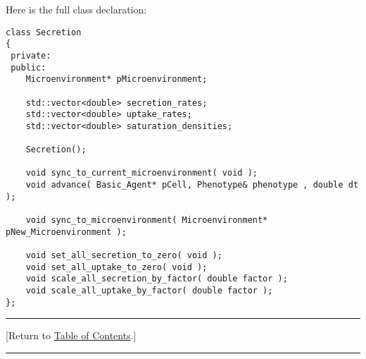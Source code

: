 \documentclass[12pt]{article}
\newcommand{\TOClink}{\begin{center}\hrule\vskip-10pt\phantom{.}\hfill[Return to \hyperlink{TOC}{Table of Contents}.]\hfill\phantom{.}\vskip3pt\hrule\end{center}}
\begin{document}
Here is the full class declaration:
\begin{verbatim}
class Secretion
{
 private:
 public:
    Microenvironment* pMicroenvironment; 
    
    std::vector<double> secretion_rates; 
    std::vector<double> uptake_rates; 
    std::vector<double> saturation_densities;

    Secretion();      

    void sync_to_current_microenvironment( void );      
    void advance( Basic_Agent* pCell, Phenotype& phenotype , double dt ); 
    
    void sync_to_microenvironment( Microenvironment* pNew_Microenvironment );
    
    void set_all_secretion_to_zero( void ); 
    void set_all_uptake_to_zero( void ); 
    void scale_all_secretion_by_factor( double factor ); 
    void scale_all_uptake_by_factor( double factor ); 
};
\end{verbatim}

\TOClink
\end{document}
